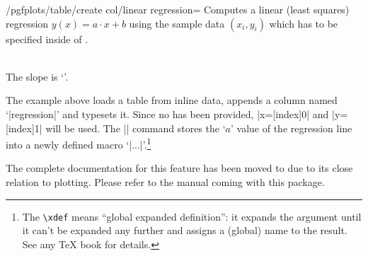 \documentclass[a4paper]{ltxdoc}
\begin{document}
\begin{stylekey}{/pgfplots/table/create col/linear regression=}
    Computes a linear (least squares) regression $y(x) = a \cdot x + b$ using
    the sample data $(x_i,y_i)$ which has to be specified inside of
    .
\begin{codeexample}[pre={\vbox\bgroup\hsize=3cm},post=\egroup]
\loadedtbl

    {\loadedtbl}
\xdef\slope{\pgfplotstableregressiona}

\pgfplotstabletypeset\loadedtbl\\

The slope is `\slope'.
\end{codeexample}
    \noindent The example above loads a table from inline data, appends a
    column named `|regression|' and typesets it. Since no
     has been provided, |x=[index]0| and |y=[index]1|
    will be used. The |\xdef\slope{...}| command stores the `$a$' value of the
    regression line into a newly defined macro `|\slope|'.\footnote{The
    \texttt{\textbackslash xdef} means ``global expanded definition'': it
    expands the argument until it can't be expanded any further and assigns a
    (global) name to the result. See any \TeX{} book for details.}

    The complete documentation for this feature has been moved to \PGFPlots{}
    due to its close relation to plotting. Please refer to the \PGFPlots{}
    manual coming with this package.
\end{stylekey}
\end{document}
